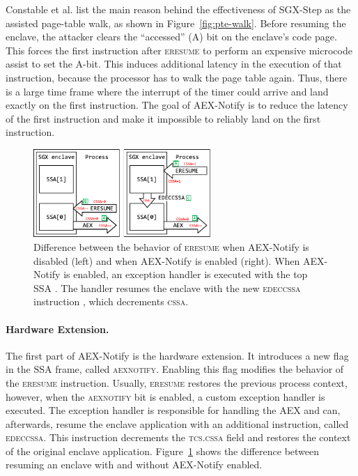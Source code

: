 \documentclass{llncs}
\begin{document}
Constable et al. \cite{ConstableBCXXAK23} list the main reason behind the
effectiveness of SGX-Step as the assisted page-table walk, as shown in
Figure~\ref{fig:pte-walk}.
Before resuming the enclave, the attacker clears the ``accessed'' (A) bit on
the enclave's code page.
This forces the first instruction after \textsc{eresume}
to perform an expensive microcode assist to set the A-bit.
This induces additional latency in the execution of that instruction, because
the processor has to walk the page table again.
Thus, there is a large time frame where the interrupt of the timer could arrive
and land exactly on the first instruction.
The goal of AEX-Notify is to reduce the latency of the first instruction and
make it impossible to reliably land on the first instruction.

\begin{figure}[t]
  \centering
  \includegraphics[width=0.6\textwidth]{images/sgx-ssa-edeccssa.pdf}
  \caption{
    Difference between the behavior of \textsc{eresume} when AEX-Notify is
    disabled (left) and when AEX-Notify is enabled (right).
    When AEX-Notify is enabled, an exception handler is executed with the top
    SSA \protect{}.
    The handler resumes the enclave with the new \textsc{edeccssa} instruction
    \protect{}, which decrements \textsc{cssa}.}
  \label{fig:aex-notify-edeccssa}
\end{figure}

\paragraph{Hardware Extension.}
The first part of AEX-Notify is the hardware extension.
It introduces a new flag in the SSA frame, called \textsc{aexnotify}.
Enabling this flag modifies the behavior of the \textsc{eresume} instruction.
Usually, \textsc{eresume} restores the previous process context, however, when
the \textsc{aexnotify} bit is enabled, a custom exception handler is executed.
The exception handler is responsible for handling the AEX and can, afterwards,
resume the enclave application with an additional instruction, called
\textsc{edeccssa}.
This instruction decrements the \textsc{tcs.cssa} field and restores the
context of the original enclave application.
Figure~\ref{fig:aex-notify-edeccssa} shows the difference between resuming an
enclave with and without AEX-Notify enabled.
\end{document}
